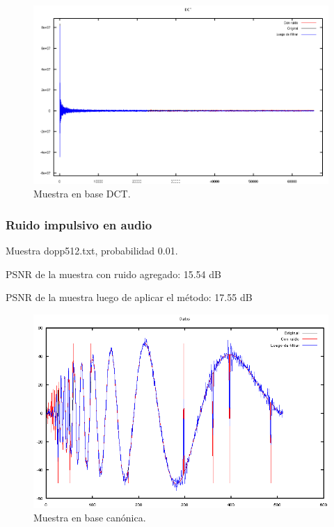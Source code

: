 \documentclass[a4paper,10pt,twoside]{article}
\begin{document}
\begin{figure}[H]
  \centering
  \includegraphics[width=15cm]{graficos/lena_aditivo_atenuar_dct.png} 
  \caption{Muestra en base DCT.}
\end{figure}


\subsubsection{Ruido impulsivo en audio}

Muestra dopp512.txt, probabilidad 0.01.

PSNR de la muestra con ruido agregado: 15.54 dB

PSNR de la muestra luego de aplicar el método: 17.55 dB

\begin{figure}[H]
  \centering
  \includegraphics[width=15cm]{graficos/dopp_impulsivo_atenuar_muestra.png} 
  \caption{Muestra en base canónica.}
\end{figure}
\end{document}
